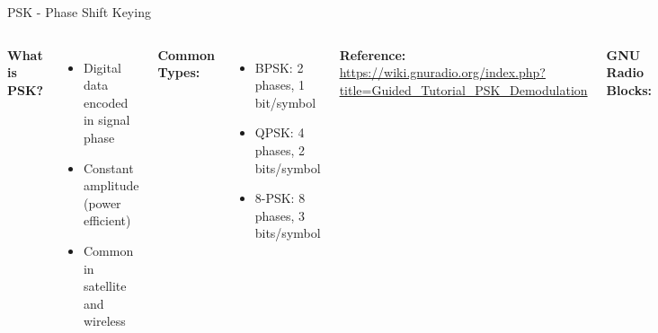 \documentclass[aspectratio=169,11pt]{beamer}
\begin{document}
\begin{frame}{PSK - Phase Shift Keying}
\begin{columns}
\textbf{What is PSK?}
\begin{itemize}
    \item Digital data encoded in signal phase
    \item Constant amplitude (power efficient)
    \item Common in satellite and wireless
\end{itemize}


\vspace{0.3cm}
\textbf{Common Types:}
\begin{itemize}
    \item BPSK: 2 phases, 1 bit/symbol
    \item QPSK: 4 phases, 2 bits/symbol
    \item 8-PSK: 8 phases, 3 bits/symbol
\end{itemize}

\vspace{0.3cm}
\textbf{Reference:}\\
\tiny\url{https://wiki.gnuradio.org/index.php?title=Guided_Tutorial_PSK_Demodulation}
\normalsize

\textbf{GNU Radio Blocks:}
\begin{itemize}
    \item PSK Mod/Demod
    \item Constellation Object
    \item Costas Loop (carrier sync)
    \item Symbol Sync
\end{itemize}

\vspace{0.3cm}
\textbf{Key Parameters:}
\begin{itemize}
    \item Samples per symbol: 2-8
    \item Excess bandwidth: 0.35
    \item Gray coding for BER
\end{itemize}
\end{columns}
\end{frame}
\end{document}

